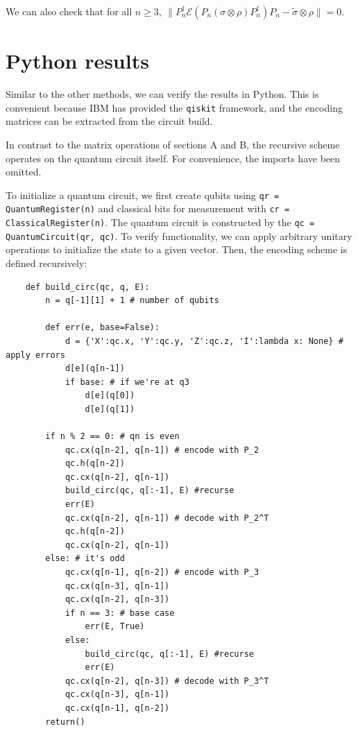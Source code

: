 \documentclass[11pt]{article}
\def\cE{{\mathcal E}}
\begin{document}
\noindent We can also check that for all $n\ge 3,\ \|P_n^\dag \cE( P_n (\sigma \otimes \rho) P_n^\dag) P_n  
-\tilde \sigma \otimes \rho\|=0$.



\section{Python results}
Similar to the other methods, we can verify the results in Python. 
This is convenient because IBM has provided the \verb|qiskit| framework, and the encoding matrices
can be extracted from the circuit build.

In contrast to the matrix operations of sections A and B, the recursive scheme operates on the quantum circuit itself. For convenience, the imports have been omitted. 

To initialize a quantum circuit, we first create qubits using \verb|qr = QuantumRegister(n)| and classical bits for measurement with \verb|cr = ClassicalRegister(n)|. The quantum circuit is constructed by the \verb|qc = QuantumCircuit(qr, qc)|. To verify functionality, we can apply arbitrary unitary operations to initialize the state to a given vector. Then, the encoding scheme is defined recursively:

\begin{verbatim}
    def build_circ(qc, q, E):
        n = q[-1][1] + 1 # number of qubits

        def err(e, base=False):
            d = {'X':qc.x, 'Y':qc.y, 'Z':qc.z, 'I':lambda x: None} # apply errors
            d[e](q[n-1])
            if base: # if we're at q3
                d[e](q[0])
                d[e](q[1])
        
        if n % 2 == 0: # qn is even
            qc.cx(q[n-2], q[n-1]) # encode with P_2
            qc.h(q[n-2])
            qc.cx(q[n-2], q[n-1])
            build_circ(qc, q[:-1], E) #recurse
            err(E)
            qc.cx(q[n-2], q[n-1]) # decode with P_2^T
            qc.h(q[n-2])
            qc.cx(q[n-2], q[n-1])
        else: # it's odd
            qc.cx(q[n-1], q[n-2]) # encode with P_3
            qc.cx(q[n-3], q[n-1])
            qc.cx(q[n-2], q[n-3])
            if n == 3: # base case
                err(E, True)
            else:
                build_circ(qc, q[:-1], E) #recurse
                err(E)
            qc.cx(q[n-2], q[n-3]) # decode with P_3^T
            qc.cx(q[n-3], q[n-1])
            qc.cx(q[n-1], q[n-2])
        return()
\end{verbatim}
\end{document}
